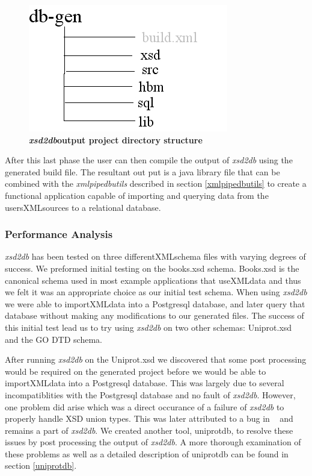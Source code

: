 \begin{figure}[htbp]
\begin{center}
\includegraphics[scale=0.8]{./Images/xsd2dbStructure.jpg}
\caption{{\bf \emph{xsd2db}output project directory structure}}
\label{xsd2dbStructure}
\end{center}
\end{figure}

After this last phase the user can then compile the output of \emph{xsd2db} using the generated build file.  The resultant out put is a java library file that can be combined with the \emph{xmlpipedbutils} described in section \ref{xmlpipedbutils} to create a functional application capable of importing and querying data from the usersXMLsources to a relational database.

\subsubsection{Performance Analysis}
\emph{xsd2db} has been tested on three differentXMLschema files with varying degrees of success.  We preformed initial testing on the books.xsd schema.  Books.xsd is the canonical schema used in most example applications that useXMLdata and thus we felt it was an appropriate choice as our initial test schema.  When using \emph{xsd2db} we were able to importXMLdata into a Postgresql database, and later query that database without making any modifications to our generated files.  The success of this initial test lead us to try using \emph{xsd2db} on two other schemas: Uniprot.xsd and the GO DTD schema.  

After running \emph{xsd2db} on the Uniprot.xsd we discovered that some post processing would be required on the generated project before we would be able to importXMLdata into a Postgresql database.  This was largely due to several incompatiblities with the Postgresql database and no fault of \emph{xsd2db}.  However, one problem did arise which was a direct occurance of a failure of \emph{xsd2db} to properly handle XSD union types.  This was later attributed to a bug in ~  and remains a part of \emph{xsd2db}.  We created another tool, uniprotdb, to resolve these issues by post processing the output of \emph{xsd2db}.  A more thorough examination of these problems as well as a detailed description of uniprotdb can be found in section \ref{uniprotdb}.

